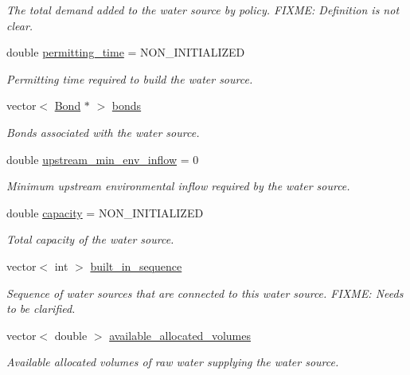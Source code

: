 \begin{DoxyCompactItemize}
\begin{DoxyCompactList}\small\item\em The total demand added to the water source by policy. F\+I\+X\+ME\+: Definition is not clear. \end{DoxyCompactList}\item 
double \mbox{\hyperlink{classWaterSource_a036d7980e74224fd5f5c6a390e0d5abb}{permitting\+\_\+time}} = N\+O\+N\+\_\+\+I\+N\+I\+T\+I\+A\+L\+I\+Z\+ED
\begin{DoxyCompactList}\small\item\em Permitting time required to build the water source. \end{DoxyCompactList}\item 
vector$<$ \mbox{\hyperlink{classBond}{Bond}} $\ast$ $>$ \mbox{\hyperlink{classWaterSource_a413b094e11bdce62f4d82e5bb9e4706e}{bonds}}
\begin{DoxyCompactList}\small\item\em Bonds associated with the water source. \end{DoxyCompactList}\item 
double \mbox{\hyperlink{classWaterSource_a67165e29345b61f36c8d8ccf3f648819}{upstream\+\_\+min\+\_\+env\+\_\+inflow}} = 0
\begin{DoxyCompactList}\small\item\em Minimum upstream environmental inflow required by the water source. \end{DoxyCompactList}\item 
double \mbox{\hyperlink{classWaterSource_a2ec257b415b248214a8bce7fc5267723}{capacity}} = N\+O\+N\+\_\+\+I\+N\+I\+T\+I\+A\+L\+I\+Z\+ED
\begin{DoxyCompactList}\small\item\em Total capacity of the water source. \end{DoxyCompactList}\item 
vector$<$ int $>$ \mbox{\hyperlink{classWaterSource_a49f9da70a5080abe82160b1a0d194e60}{built\+\_\+in\+\_\+sequence}}
\begin{DoxyCompactList}\small\item\em Sequence of water sources that are connected to this water source. F\+I\+X\+ME\+: Needs to be clarified. \end{DoxyCompactList}\item 
vector$<$ double $>$ \mbox{\hyperlink{classWaterSource_a77d3fe9ea445fc987b07debdfb9e2f5b}{available\+\_\+allocated\+\_\+volumes}}
\begin{DoxyCompactList}\small\item\em Available allocated volumes of raw water supplying the water source. \end{DoxyCompactList}\item 

\end{DoxyCompactItemize}
